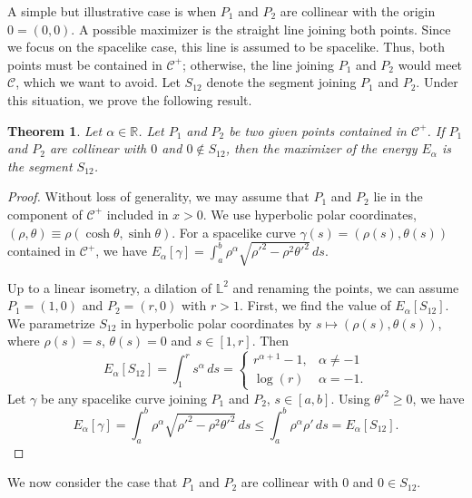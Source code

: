 \documentclass[a4paper,12pt]{amsart}
\newtheorem{theorem}{Theorem}[section]
\theoremstyle{definition}
\def\r{\mathbb R}
\def\l{\mathbb L}
\begin{document}
  A simple but illustrative case is when $P_1$ and $P_2$ are collinear with the origin $0=(0,0)$. A possible maximizer is the straight line joining both points. Since we focus on the spacelike case, this line is assumed to be spacelike. Thus,   both points must be contained in $\mathcal{C}^+$; otherwise, the line joining $P_1$ and $P_2$ would meet  $\mathcal{C}$, which we want to avoid. Let $S_{12}$ denote the segment joining $P_1$ and $P_2$. Under this situation, we prove the following result.
 
  

\begin{theorem} \label{t52}
Let $\alpha\in\r$. Let $P_1$ and $P_2$ be two given points contained in $\mathcal{C}^+$. If $P_1$ and $P_2$ are collinear with $0$ and $0\not\in S_{12}$, then the maximizer of the energy $E_\alpha$ is the segment $S_{12}$.
\end{theorem}

\begin{proof} Without loss of generality, we may assume that $P_1$ and $P_2$ lie in the component of $\mathcal{C}^+$ included in $x>0$. We use hyperbolic polar coordinates, $(\rho,\theta)\equiv \rho(\cosh\theta,\sinh\theta)$. For a spacelike curve $\gamma(s)=(\rho(s),\theta(s))$ contained in $\mathcal{C}^+$, we have 
$E_\alpha[\gamma]=\int_a^b\rho^{\alpha}\sqrt{\rho'^2-\rho^2\theta'^2}\, ds$. 
 
Up to a linear isometry, a dilation of $\l^2$ and renaming the points, we can assume $P_1=(1,0)$ and $P_2=(r,0)$  with $r>1$. First, we find the value of $E_\alpha[S_{12}]$. We parametrize $S_{12}$ in hyperbolic polar coordinates  by $s\mapsto (\rho(s),\theta(s))$, where $\rho(s)=s$, $\theta(s)=0$ and $s\in [1,r]$.   Then
$$E_\alpha[S_{12}]=\int_1^r s^\alpha\, ds=\left\{\begin{array}{ll}r^{\alpha+1}-1,&\alpha\not=-1\\ \log(r)&\alpha=-1.\end{array}\right.$$
Let $\gamma$ be any spacelike curve joining $P_1$ and $P_2$, $s\in [a,b]$. Using $\theta'^2\geq 0$, we have   
\begin{equation*}
E_\alpha[\gamma]=\int_a^b\rho^\alpha\sqrt{\rho'^2-\rho^2\theta'^2}\, ds\leq \int_a^b\rho^\alpha \rho' \, ds=
E_\alpha[S_{12}].
\end{equation*}

\end{proof}

We now consider the case that $P_1$ and $P_2$ are collinear with $0$ and $0\in S_{12}$.  
\end{document}
